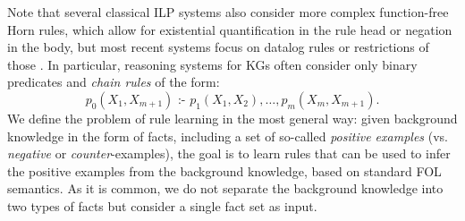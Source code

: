 \documentclass[letterpaper]{article} \usepackage{aaai20}  \usepackage{times}  \usepackage{helvet} \usepackage{courier}  \usepackage[hyphens]{url}  \usepackage{graphicx} \urlstyle{rm} \def\UrlFont{\rm}  \usepackage{graphicx}  \frenchspacing  \setlength{\pdfpagewidth}{8.5in}  \setlength{\pdfpageheight}{11in}  \usepackage{amsthm}
\theoremstyle{definition}
\newcommand{\ass}{\text{ :- }}
\begin{document}
Note that several classical ILP systems also consider more complex function-free Horn rules, which allow for existential quantification in the rule head or negation in the body, but most recent systems focus on datalog rules or restrictions of those \cite{Galarraga+-VLDBJ15:amiep,EGre-jair18:learning-explanatory-rules,RoR-NIPS17}. In particular, reasoning systems for KGs \cite{YaYaCo-NIPS17:neurallp,OWaWa-IJCAI18:scalable-rule-learning}
often consider only binary predicates and \emph{chain rules} of the form:
\begin{equation}\label{eq:chainrule}
 p_0(X_1,X_{m+1})\ass p_1(X_1,X_2),\dots,p_{m}(X_{m},X_{m+1}). 
\end{equation}
We define the problem of rule learning in the most general way:
given 
background knowledge in the form of facts, including a set of so-called \emph{positive examples} (vs. \emph{negative} or \emph{counter}-examples), the goal is to learn rules that can be used to infer the positive examples from the background knowledge, based on standard FOL semantics.
As it is common, we do not separate the background knowledge into two types of facts but consider a single fact set as input.
\end{document}
